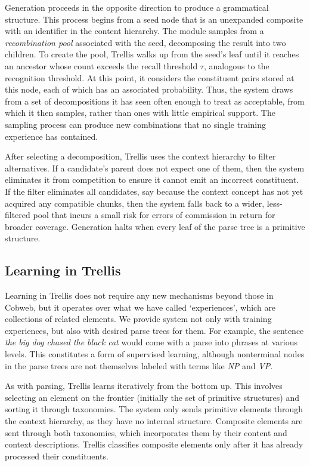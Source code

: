\documentclass[11pt,letterpaper]{article}
\def\trellis/{{\sc Trellis}}
\begin{document}
Generation proceeds in the opposite direction to produce a
grammatical structure. This process begins from a seed node that
is an unexpanded composite with an identifier in the content
hierarchy. The module samples from a {\it recombination pool\/}
associated with the seed, decomposing the result into two children.
To create the pool, \trellis/ walks up from the seed's leaf until
it reaches an ancestor whose count exceeds the recall threshold 
$\tau$, analogous to the recognition threshold. At this point, 
it considers the constituent pairs stored at this node, each of 
which has an associated probability. Thus, the system draws from a 
set of decompositions it has seen often enough to treat as acceptable, 
from which it then samples, rather than ones with little empirical
support. The sampling process can produce new combinations that
no single training experience has contained.

After selecting a decomposition, \trellis/ uses the context hierarchy
to filter alternatives. If a candidate's parent does not expect one 
of them, then the system eliminates it from competition to ensure it
cannot emit an incorrect constituent. If the filter eliminates all
candidates, say because the context concept has not yet acquired any
compatible chunks, then the system falls back to a wider, less-filtered
pool that incurs a small risk for errors of commission in return
for broader coverage. Generation halts when every leaf of the parse
tree is a primitive structure.


\subsection{Learning in \trellis/}

Learning in \trellis/ does not require any new mechanisms beyond those
in Cobweb, but it operates over what we have called `experiences',
which are collections of related elements. We provide system 
not only with training experiences, but also with desired parse trees
for them. For example, the sentence {\sl the big dog chased the black 
cat} would come with a parse into phrases at various levels. This
constitutes a form of supervised learning, although nonterminal nodes
in the parse trees are not themselves labeled with terms like {\sl NP} 
and {\sl VP}. 

As with parsing, \trellis/ learns iteratively from the bottom up.
This involves selecting an element on the frontier (initially the
set of primitive structures) and sorting it through taxonomies.
The system only sends primitive elements through the context
hierarchy, as they have no internal structure. Composite elements
are sent through both taxonomies, which incorporates them by their 
content and context descriptions. \trellis/ classifies composite
elements only after it has already processed their constituents.
\end{document}

